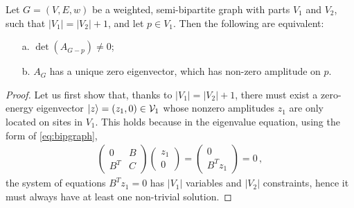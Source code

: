 \begin{proposition}\label{prop:2conditionsequiv}
Let $G = (V,E,w)$ be a weighted, semi-bipartite graph with parts $V_1$ and $V_2$, such that $ |V_1| = |V_2| + 1$, and let $ p \in V_1$. Then the following are equivalent:
\begin{itemize}
    \item[a.] $\det (A_{G-p}) \neq 0$;
    \item[b.] $A_G$ has a unique zero eigenvector, which has non-zero amplitude on $p$.
\end{itemize}
\end{proposition}
\begin{proof}
Let us first show that, thanks to $|V_1| = |V_2|+1$, there must exist a zero-energy eigenvector $\lvert z\rangle = (z_1, 0) \in \mathcal{V}_1$ whose nonzero amplitudes $z_1$ are only located on sites in $V_1$. This holds because in the eigenvalue equation, using the form of \cref{eq:bipgraph},
\begin{align*}
\begin{pmatrix} 0 & B \\ B^T & C \end{pmatrix} \begin{pmatrix} z_1 \\ 0 \end{pmatrix}  = \begin{pmatrix} 0 \\ B^T z_1 \end{pmatrix} = 0\,,
\end{align*}
the system of equations $B^T z_1 = 0$ has $|V_1|$ variables and $|V_2|$ constraints, hence it must always have at least one non-trivial solution.


\end{proof}
